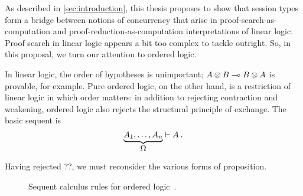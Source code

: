 As described in \cref{sec:introduction}, this thesis proposes to show that session types form a bridge between notions of concurrency that arise in proof-search-as-computation and proof-reduction-as-computation interpretations of linear logic.
Proof search in linear logic appears a bit too complex to tackle outright.
So, in this proposal, we turn our attention to ordered logic.

In linear logic, the order of hypotheses is unimportant; $A \otimes B \multimap B \otimes A$ is provable, for example.
Pure ordered logic, on the other hand, is a restriction of linear logic in which order matters:
in addition to rejecting contraction and weakening, ordered logic also rejects the structural principle of exchange.
The basic sequent is
\begin{equation*}
  \underbrace{A_1, \dotsc, A_n}_{\displaystyle \Omega} \vdash A \:.
\end{equation*}

Having rejected {??}, we must reconsider the various forms of proposition.


\begin{figure}
  \caption{Sequent calculus rules for ordered logic~\autocite{Polakow+Pfenning:MFPS99,Simmons:CMU12}.}
\end{figure}




